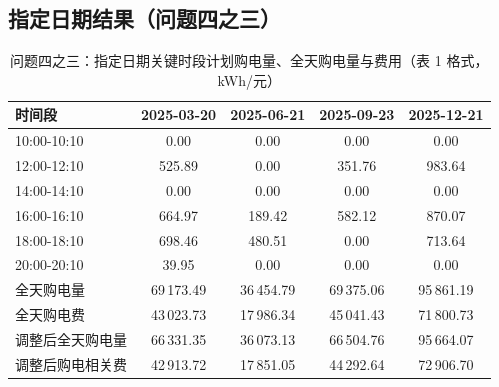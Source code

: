\subsection{指定日期结果（问题四之三\nobreak）}

\begin{table}[htbp]
\centering
\caption{问题四之三\nobreak：指定日期关键时段计划购电量\nobreak、全天购电量与费用（表 1 格式\nobreak，kWh/元\nobreak）}
\label{tab:q4t1}
\begin{tabular}{@{}lcccc@{}}
\toprule
时间段 & 2025-03-20 & 2025-06-21 & 2025-09-23 & 2025-12-21 \\
\midrule
10:00-10:10 & 0.00 & 0.00 & 0.00 & 0.00 \\
12:00-12:10 & 525.89 & 0.00 & 351.76 & 983.64 \\
14:00-14:10 & 0.00 & 0.00 & 0.00 & 0.00 \\
16:00-16:10 & 664.97 & 189.42 & 582.12 & 870.07 \\
18:00-18:10 & 698.46 & 480.51 & 0.00 & 713.64 \\
20:00-20:10 & 39.95 & 0.00 & 0.00 & 0.00 \\
\midrule
全天购电量 & 69\,173.49 & 36\,454.79 & 69\,375.06 & 95\,861.19 \\
全天购电费 & 43\,023.73 & 17\,986.34 & 45\,041.43 & 71\,800.73 \\
调整后全天购电量 & 66\,331.35 & 36\,073.13 & 66\,504.76 & 95\,664.07 \\
调整后购电相关费 & 42\,913.72 & 17\,851.05 & 44\,292.64 & 72\,906.70 \\
\bottomrule
\end{tabular}
\end{table}

